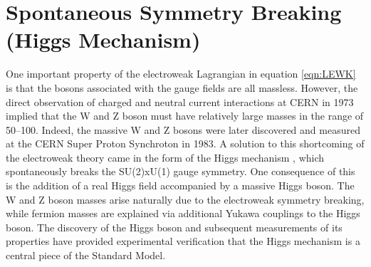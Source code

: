 \section{Spontaneous Symmetry Breaking (Higgs Mechanism)}
One important property of the electroweak Lagrangian in equation \ref{eqn:LEWK} is that the bosons associated with the gauge fields are all massless. 
However, the direct observation of charged and neutral 
current interactions \cite{HASERT1973121,HASERT1973138} at CERN in 1973 implied that the W and Z boson must have relatively large masses in the range of 50--100\GeV. Indeed, the massive W and Z bosons were later discovered and measured \cite{UA1:1983crd,UA2:1983tsx} at the CERN Super Proton Synchroton in 1983. 
A solution to this shortcoming of the electroweak theory came in the form of the Higgs mechanism \cite{Englert:1964et,Higgs:1964ia,Higgs:1964pj},
which spontaneously breaks the SU(2)xU(1) gauge symmetry. One consequence of this is the addition of a real 
Higgs field accompanied by a massive Higgs boson. The W and Z boson masses arise naturally due to the electroweak symmetry breaking, 
while fermion masses are explained via additional Yukawa couplings to the Higgs boson. 
The discovery of the Higgs boson and subsequent measurements of its properties have provided experimental verification that the Higgs mechanism 
is a central piece of the Standard Model. 

